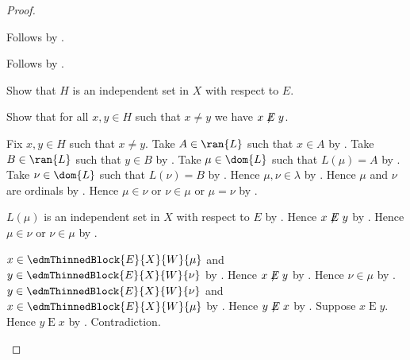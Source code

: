 \begin{proof}
\begin{subproof}
\begin{subproof}
            Follows by .
        \end{subproof}
        Follows by .
    \end{subproof}
    Show that $H$ is an independent set in $X$ with respect to $E$.
    \begin{subproof}
        Show that for all $x,y\in H$ such that $x\neq y$ we have
            $x\not\mathrel{E}y$.
        \begin{subproof}
            Fix $x,y\in H$ such that $x\neq y$.
            Take $A\in\ran{L}$ such that $x\in A$ by
                .
            Take $B\in\ran{L}$ such that $y\in B$ by
                .
            Take $\mu\in\dom{L}$ such that $L(\mu)=A$ by
                .
            Take $\nu\in\dom{L}$ such that $L(\nu)=B$ by
                .
            Hence $\mu,\nu\in\lambda$ by \auto.
            Hence $\mu$ and $\nu$ are ordinals by
                .
            Hence $\mu\in\nu$ or $\nu\in\mu$ or $\mu=\nu$ by
                .
            \begin{byCase}
                    $L(\mu)$ is an independent set in $X$ with respect to
                        $E$ by \auto.
                    Hence $x\not\mathrel{E}y$ by
                        .
                    Hence $\mu\in\nu$ or $\nu\in\mu$ by \auto.
                    \begin{byCase}
                            $x\in\edmThinnedBlock{E}{X}{W}{\mu}$ and
                                $y\in\edmThinnedBlock{E}{X}{W}{\nu}$ by
                                \auto.
                            Hence $x\not\mathrel{E}y$ by
                                .
                            Hence $\nu\in\mu$ by \auto.
                            $y\in\edmThinnedBlock{E}{X}{W}{\nu}$ and
                                $x\in\edmThinnedBlock{E}{X}{W}{\mu}$ by
                                \auto.
                            Hence $y\not\mathrel{E}x$ by
                                .
                            Suppose $x\mathrel{E}y$.
                            Hence $y\mathrel{E}x$ by
                                .
                            Contradiction.

\end{byCase}
\end{byCase}
\end{subproof}
\end{subproof}
\end{proof}
